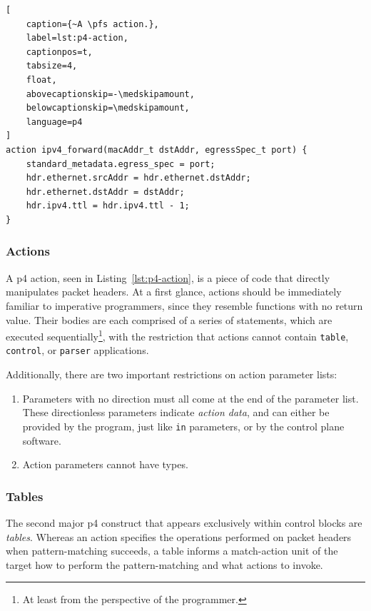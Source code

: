 \begin{lstlisting}[
	caption={~A \pfs action.},
	label=lst:p4-action,
	captionpos=t,
	tabsize=4,
	float,
	abovecaptionskip=-\medskipamount,
	belowcaptionskip=\medskipamount,
	language=p4
]
action ipv4_forward(macAddr_t dstAddr, egressSpec_t port) {
	standard_metadata.egress_spec = port;
	hdr.ethernet.srcAddr = hdr.ethernet.dstAddr;
	hdr.ethernet.dstAddr = dstAddr;
	hdr.ipv4.ttl = hdr.ipv4.ttl - 1;
}
\end{lstlisting}

\subsubsection*{Actions}

A \acrshort{p4} action, seen in Listing~\ref{lst:p4-action}, is a piece of code
that directly manipulates packet headers. At a first glance, actions should be
immediately familiar to imperative programmers, since they resemble functions
with no return value. Their bodies are each comprised of a series of statements,
which are executed sequentially\footnote{At least from the perspective of the
programmer.}, with the restriction that actions cannot contain \texttt{table},
\texttt{control}, or \texttt{parser} applications.

Additionally, there are two important restrictions on action parameter lists:

\begin{enumerate}
	\item Parameters with no direction must all come at the end of the parameter
	list. These directionless parameters indicate \emph{action data}, and can
	either be provided by the program, just like \texttt{in} parameters, or by
	the control plane software.
	\item Action parameters cannot have \extern{} types.
\end{enumerate}

\subsubsection*{Tables}

The second major \acrshort{p4} construct that appears exclusively within control
blocks are \emph{tables}. Whereas an action specifies the operations performed
on packet headers when pattern-matching succeeds, a table informs a match-action
unit of the target how to perform the pattern-matching and what actions to
invoke.


